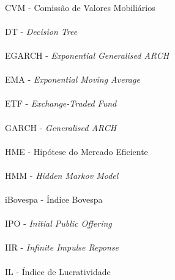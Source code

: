 \paragraph{}CVM - Comissão de Valores Mobiliários
\paragraph{}DT - \textit{Decision Tree}
\paragraph{}EGARCH - \textit{Exponential Generalised ARCH}
\paragraph{}EMA - \textit{Exponential Moving Average}
\paragraph{}ETF - \textit{Exchange-Traded Fund}
\paragraph{}GARCH - \textit{Generalised ARCH}
\paragraph{}HME - Hipótese do Mercado Eficiente
\paragraph{}HMM - \textit{Hidden Markov Model}
\paragraph{}iBovespa - Índice Bovespa
\paragraph{}IPO - \textit{Initial Public Offering}
\paragraph{}IIR - \textit{Infinite Impulse Reponse}
\paragraph{}IL - Índice de Lucratividade
